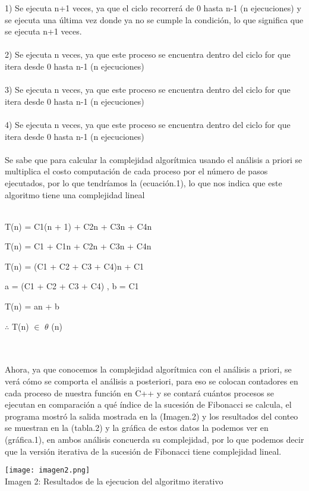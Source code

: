 \documentclass[12pt,twoside]{article}
\begin{document}
1) Se ejecuta n+1 veces, ya que el ciclo recorrerá de 0 hasta n-1 (n ejecuciones) y se ejecuta una última vez donde ya no se cumple la condición, lo que significa que se ejecuta n+1 veces.\\  \\
2) Se ejecuta n veces, ya que este proceso se encuentra dentro del ciclo for que itera desde 0 hasta n-1 (n ejecuciones)\\ \\
3) Se ejecuta n veces, ya que este proceso se encuentra dentro del ciclo for que itera desde 0 hasta n-1 (n ejecuciones)\\ \\
4) Se ejecuta n veces, ya que este proceso se encuentra dentro del ciclo for que itera desde 0 hasta n-1 (n ejecuciones)\\ \\
Se sabe que para calcular la complejidad algorítmica usando el análisis a priori se multiplica el costo computación de cada proceso por el número de pasos ejecutados, por lo que tendríamos la (ecuación.1), lo que nos indica que este algoritmo tiene una complejidad lineal\\ \\
\centerline{T(n) = C1(n + 1) + C2n + C3n + C4n}
\centerline{T(n) = C1 + C1n + C2n + C3n + C4n}
\centerline{T(n) = (C1 + C2 + C3 + C4)n + C1}
\centerline{a = (C1 + C2 + C3 + C4) , b = C1}
\centerline{T(n) = an + b}
\centerline{ $\therefore$ T(n) $\in$ $\theta$ (n) }
\\ \\
Ahora, ya que conocemos la complejidad algorítmica con el análisis a priori, se verá cómo se comporta el análisis a posteriori, para eso se colocan contadores en cada proceso de nuestra función en C++ y se contará cuántos procesos se ejecutan en comparación a qué índice de la sucesión de Fibonacci se calcula, el programa mostró la salida mostrada en la (Imagen.2) y los resultados del conteo se muestran en la (tabla.2) y la gráfica de estos datos la podemos ver en (gráfica.1), en ambos análisis concuerda su complejidad, por lo que podemos decir que la versión iterativa de la sucesión de Fibonacci tiene complejidad lineal.

\begin{center}
  \begin{minipage}{\linewidth}
    \centering
    \texttt{[image: imagen2.png]}
    \\
    Imagen 2: Resultados de la ejecucion del algoritmo iterativo
\end{minipage}
\end{center}
\medskip
\end{document}
